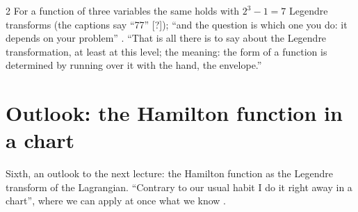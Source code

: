 \begin{paracol}{2}
For a function of three variables the same holds with $2^3-1=7$ Legendre transforms (the captions say ``77'' [?]); ``and the question is which one you do: it depends on your problem'' . ``That is all there is to say about the Legendre transformation, at least at this level; the meaning: the form of a function is determined by running over it with the hand, the envelope.'' 

\section{Outlook: the Hamilton function in a chart}\label{sec:lt-outlook}

Sixth, an outlook to the next lecture: the Hamilton function as the Legendre transform of the Lagrangian. ``Contrary to our usual habit I do it right away in a chart'', where we can apply at once what we know .


\end{paracol}
